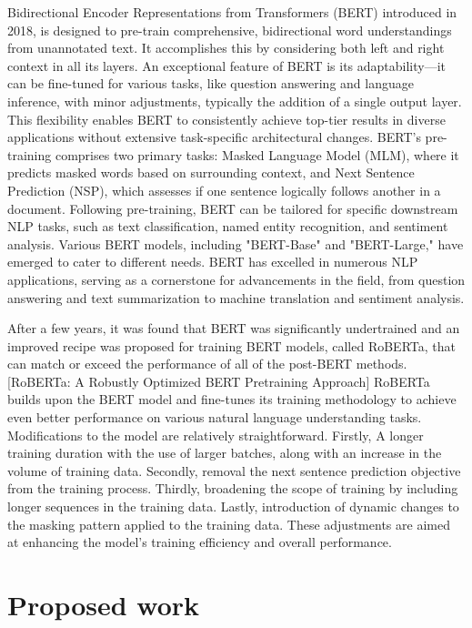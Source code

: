 \documentclass[conference]{IEEEtran}
\begin{document}
Bidirectional Encoder Representations from Transformers (BERT) introduced in 2018, is designed to pre-train comprehensive, bidirectional word understandings from unannotated text. It accomplishes this by considering both left and right context in all its layers. An exceptional feature of BERT is its adaptability—it can be fine-tuned for various tasks, like question answering and language inference, with minor adjustments, typically the addition of a single output layer. This flexibility enables BERT to consistently achieve top-tier results in diverse applications without extensive task-specific architectural changes. BERT's pre-training comprises two primary tasks: Masked Language Model (MLM), where it predicts masked words based on surrounding context, and Next Sentence Prediction (NSP), which assesses if one sentence logically follows another in a document. Following pre-training, BERT can be tailored for specific downstream NLP tasks, such as text classification, named entity recognition, and sentiment analysis. Various BERT models, including "BERT-Base" and "BERT-Large," have emerged to cater to different needs. BERT has excelled in numerous NLP applications, serving as a cornerstone for advancements in the field, from question answering and text summarization to machine translation and sentiment analysis.

After a few years, it was found that BERT was significantly undertrained and an improved recipe was proposed for training BERT models, called RoBERTa, that can match or exceed the performance of all of the post-BERT methods.[RoBERTa: A Robustly Optimized BERT Pretraining Approach] RoBERTa builds upon the BERT model and fine-tunes its training methodology to achieve even better performance on various natural language understanding tasks. Modifications to the model are relatively straightforward. Firstly, A longer training duration with the use of larger batches, along with an increase in the volume of training data. Secondly, removal the next sentence prediction objective from the training process. Thirdly, broadening the scope of training by including longer sequences in the training data. Lastly, introduction of dynamic changes to the masking pattern applied to the training data. These adjustments are aimed at enhancing the model's training efficiency and overall performance.

\section{Proposed work}
\end{document}
